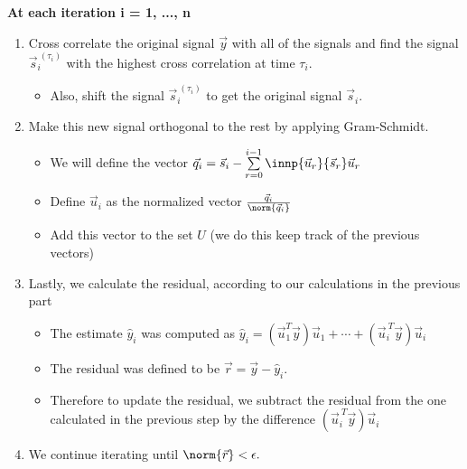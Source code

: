 \begin{enumerate}
{    \textbf{At each iteration i = 1, ..., n}
    \begin{enumerate}[label=(\arabic*)]
      \item Cross correlate the original signal $\vec{y}$ with all of the signals and find the signal $\vec{s}_{i}^{\ ({\tau_{i}})}$ with the highest cross correlation at time $\tau_{i}.$
      \begin{itemize}
        \item Also, shift the signal $\vec{s}_{i}^{\ (\tau_{i})}$ to get the original signal $\vec{s}_{i}.$
      \end{itemize}
      \item Make this new signal orthogonal to the rest by applying Gram-Schmidt. 
      \begin{itemize}
        \item We will define the vector $\vec{q}_{i} = \vec{s}_{i} - \sum\limits_{r = 0}^{i - 1} \innp{\vec{u}_{{r}}}{\vec{s}_{r}} \vec{u}_{r}$
        \item Define $\vec{u}_{i}$ as the normalized vector $\frac{\vec{q}_{i}}{\norm{\vec{q}_{i}}}$
        \item Add this vector to the set $U$ (we do this keep track of the previous vectors)
      \end{itemize}
      \item Lastly, we calculate the residual, according to our calculations in the previous part
      \begin{itemize}
        \item The estimate $\hat{y}_{i}$ was computed as $\hat{y}_{i} = (\vec{u}_{1}^{T} \vec{y}) \vec{u}_{1} + \cdots + (\vec{u}_{i}^{\ T} \vec{y}) \vec{u}_{i}$
        \item The residual was defined to be $\vec{r} = \vec{y} - \hat{y}_{i}.$ 
        \item Therefore to update the residual, we subtract the residual from the one calculated in the previous step by the difference $(\vec{u}_{i}^{\ T} \vec{y}) \vec{u}_{i}$
      \end{itemize}
      \item We continue iterating until $\norm{\vec{r}} < \epsilon.$
    \end{enumerate}
  }
\end{enumerate}